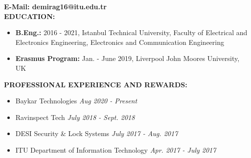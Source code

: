 \vspace{-3mm}
\textbf{E-Mail: {\normalfont demirag16@itu.edu.tr}} \\


\textbf{EDUCATION:}
\vspace{-3mm}
\begin{itemize}
  \item \textbf{B.Eng.:} 2016 - 2021, Istanbul Technical University, Faculty of Electrical and Electronics Engineering, Electronics and Communication Engineering
  \item \textbf{Erasmus Program:} Jan. - June 2019, Liverpool John Moores University, UK
\end{itemize}

\textbf{PROFESSIONAL EXPERIENCE AND REWARDS:}
\vspace{-3mm}
\begin{itemize}
  \item Baykar Technologies \hfill \textit{Aug 2020 - Present}
  \item Ravinspect Tech \hfill \textit{July 2018 - Sept. 2018}
  \item DESI Security & Lock Systems \hfill \textit{July 2017 - Aug. 2017}
  \item ITU Department of Information Technology \hfill \textit{Apr. 2017 - July 2017}
\end{itemize}


\vspace{-3mm}

\newpage

\vspace{10mm}



\vspace{-3mm}
